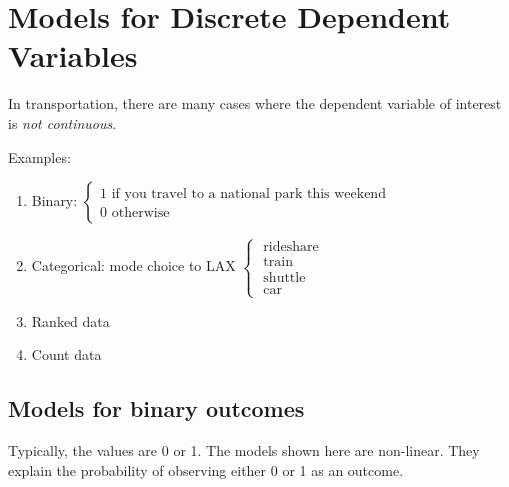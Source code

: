 \section{Models for Discrete Dependent Variables}
In transportation, there are many cases where the dependent variable of interest is \emph{not continuous}.

Examples:
\begin{enumerate}
	\item Binary: $\begin{cases}
			1 \text{ if you travel to a national park this weekend}\\
			0 \text{ otherwise}
		\end{cases}$
	\item Categorical: mode choice to LAX $\begin{cases}
			\text{ rideshare}\\
			\text{ train}\\
			\text{ shuttle}\\
			\text{ car}
		\end{cases}$
	\item Ranked data
	\item Count data
\end{enumerate}
\subsection{Models for binary outcomes}
	Typically, the values are 0 or 1.  The models shown here are non-linear. They explain the probability of observing either 0 or 1 as an outcome.
